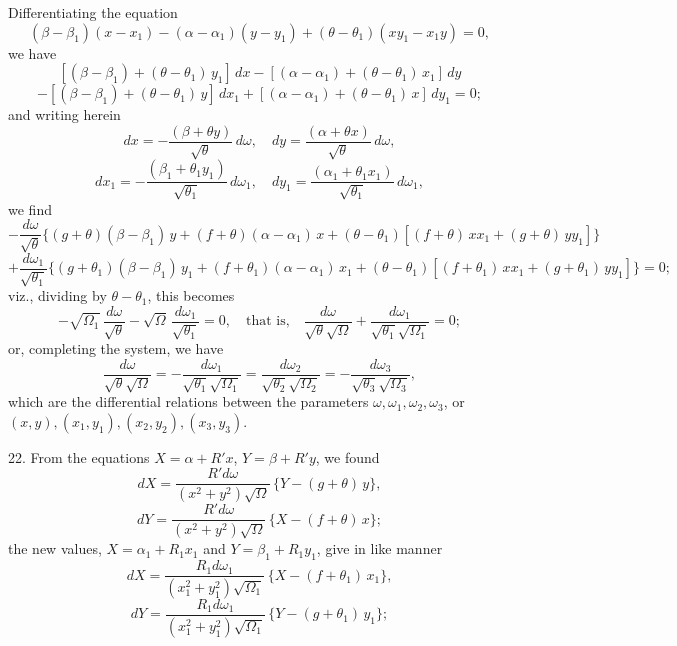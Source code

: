 \documentclass[11pt,a4paper]{article}
\begin{document}
Differentiating the equation
\[
(\beta - \beta_{1})(x - x_{1}) - (\alpha - \alpha_{1})(y - y_{1}) + (\theta - \theta_{1})(xy_{1} - x_{1}y) = 0,
\]
we have
\[
[(\beta - \beta_{1}) + (\theta - \theta_{1})\,y_{1}]\,dx - [(\alpha - \alpha_{1}) + (\theta - \theta_{1})\,x_{1}]\,dy
\]
\[
- [(\beta - \beta_{1}) + (\theta - \theta_{1})\,y]\,dx_{1} + [(\alpha - \alpha_{1}) + (\theta - \theta_{1})\,x]\,dy_{1} = 0;
\]
and writing herein
\[
dx = -\frac{(\beta + \theta y)}{\sqrt{\theta}}\,d\omega, \quad dy = \frac{(\alpha + \theta x)}{\sqrt{\theta}}\,d\omega,
\]
\[
dx_{1} = -\frac{(\beta_{1} + \theta_{1}y_{1})}{\sqrt{\theta_{1}}}\,d\omega_{1}, \quad dy_{1} = \frac{(\alpha_{1} + \theta_{1}x_{1})}{\sqrt{\theta_{1}}}\,d\omega_{1},
\]
we find
\[
-\frac{d\omega}{\sqrt{\theta}}\{(g + \theta)(\beta - \beta_{1})\,y + (f + \theta)(\alpha - \alpha_{1})\,x + (\theta - \theta_{1})[(f + \theta)\,xx_{1} + (g + \theta)\,yy_{1}]\}
\]
\[
+ \frac{d\omega_{1}}{\sqrt{\theta_{1}}}\{(g + \theta_{1})(\beta - \beta_{1})\,y_{1} + (f + \theta_{1})(\alpha - \alpha_{1})\,x_{1} + (\theta - \theta_{1})[(f + \theta_{1})\,xx_{1} + (g + \theta_{1})\,yy_{1}]\} = 0;
\]
viz., dividing by $\theta - \theta_{1}$, this becomes
\[
-\sqrt{\Omega_{1}}\,\frac{d\omega}{\sqrt{\theta}} - \sqrt{\Omega}\,\frac{d\omega_{1}}{\sqrt{\theta_{1}}} = 0, \quad \text{that is,}\quad \frac{d\omega}{\sqrt{\theta}\sqrt{\Omega}} + \frac{d\omega_{1}}{\sqrt{\theta_{1}}\sqrt{\Omega_{1}}} = 0;
\]
or, completing the system, we have
\[
\frac{d\omega}{\sqrt{\theta}\sqrt{\Omega}} = -\frac{d\omega_{1}}{\sqrt{\theta_{1}}\sqrt{\Omega_{1}}} = \frac{d\omega_{2}}{\sqrt{\theta_{2}}\sqrt{\Omega_{2}}} = -\frac{d\omega_{3}}{\sqrt{\theta_{3}}\sqrt{\Omega_{3}}},
\]
which are the differential relations between the parameters $\omega, \omega_{1}, \omega_{2}, \omega_{3}$, or $(x, y), (x_{1}, y_{1}), (x_{2}, y_{2}), (x_{3}, y_{3})$.

\medskip

22. From the equations $X = \alpha + R'x$, $Y = \beta + R'y$, we found
\[
dX = \frac{R'd\omega}{(x^{2} + y^{2})\sqrt{\Omega}}\,\{Y - (g + \theta)\,y\},
\]
\[
dY = \frac{R'd\omega}{(x^{2} + y^{2})\sqrt{\Omega}}\,\{X - (f + \theta)\,x\};
\]
the new values, $X = \alpha_{1} + R_{1}x_{1}$ and $Y = \beta_{1} + R_{1}y_{1}$, give in like manner
\[
dX = \frac{R_{1}d\omega_{1}}{(x_{1}^{2} + y_{1}^{2})\sqrt{\Omega_{1}}}\,\{X - (f + \theta_{1})\,x_{1}\},
\]
\[
dY = \frac{R_{1}d\omega_{1}}{(x_{1}^{2} + y_{1}^{2})\sqrt{\Omega_{1}}}\,\{Y - (g + \theta_{1})\,y_{1}\};
\]

\newpage
\end{document}

